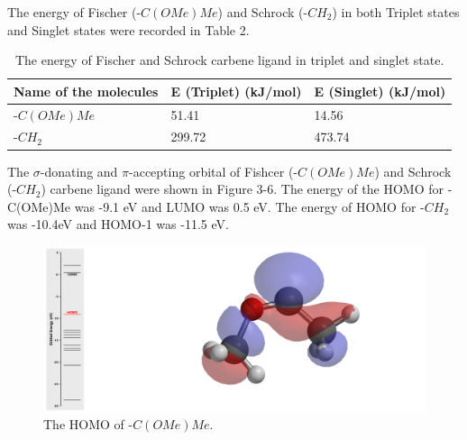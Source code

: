 \documentclass[twocolumn]{article} %
\begin{document}
\begin{table}[h]
\begin{tabular}{L{.6in}C{.6in}C{.6in}C{.6in}C{.6in}}
\end{tabular}
\end{table}



The energy of Fischer (-$C(OMe)Me$) and Schrock (-$CH_2$) in both Triplet states and Singlet states were recorded in Table 2. 


\begin{table}[h]
\caption{The energy of Fischer and Schrock carbene ligand in triplet and singlet state.}
\begin{tabular}{L{1.0in}C{1.0in}C{1.0in}}\toprule
Name of the molecules & E (Triplet) (kJ/mol) & E (Singlet) (kJ/mol)\\ \hline
-$C(OMe)Me$             & 51.41         & 14.56         \\
-$CH_2$                  & 299.72        & 473.74    \\\bottomrule   
\end{tabular}
\end{table}


The $\sigma$-donating and $\pi$-accepting orbital of Fishcer (-$C(OMe)Me$) and Schrock (-$CH_2$) carbene ligand were shown in Figure 3-6. The energy of the HOMO for -C(OMe)Me was -9.1 eV and LUMO was 0.5 eV. The energy of HOMO for -$CH_2$ was -10.4eV and HOMO-1 was -11.5 eV. 

\begin{figure}[h!]
      \centering
      \includegraphics[width=0.95\columnwidth]{C(OMe)Me HOMO white background.png} %
      \vspace{2mm} %
      \caption{The HOMO of -$C(OMe)Me$.}
\end{figure}
\end{document}
